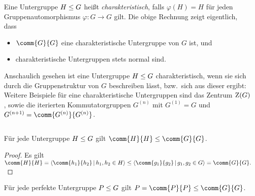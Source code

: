 \begin{remark}
  \label{remark: notion of characteristic subgroups}
  Eine Untergruppe $H \leq G$ heißt \emph{charakteristisch}, falls $\varphi(H) = H$ für jeden Gruppenautomorphismus $\varphi \colon G \to G$ gilt.
  Die obige Rechnung zeigt eigentlich, dass
  \begin{itemize}
    \item
      $\comm{G}{G}$ eine charakteristische Untergruppe von $G$ ist, und
    \item
      charakteristische Untergruppen stets normal sind.
  \end{itemize}
  Anschaulich gesehen ist eine Untergruppe $H \leq G$ charakteristisch, wenn sie sich durch die Gruppenstruktur von $G$ beschreiben lässt, bzw.\ sich aus dieser ergibt:
  Weitere Beispiele für eine charakteristische Untergruppen sind das Zentrum $\operatorname{Z}(G)$, sowie die iterierten Kommutatorgruppen $G^{(n)}$ mit $G^{(1)} = G$ und $G^{(n+1)} = \comm{ G^{(n)} }{ G^{(n)} }$.
  
\end{remark}




\subsection{}
\label{subsection: perfect subgroup contained in commutator}

\begin{lemma}
  Für jede Untergruppe $H \leq G$ gilt $\comm{H}{H} \subgroup \comm{G}{G}$.
\end{lemma}

\begin{proof}
  Es gilt
  $
          \comm{H}{H}
    =     \generated{ \comm{h_1}{h_2} \suchthat h_1, h_2 \in H }
    \subgroup  \generated{ \comm{g_1}{g_2} \suchthat g_1, g_2 \in G }
    =     \comm{G}{G}.
  $
\end{proof}

Für jede perfekte Untergruppe $P \leq G$ gilt $P = \comm{P}{P} \subgroup \comm{G}{G}$.





\subsection{}

